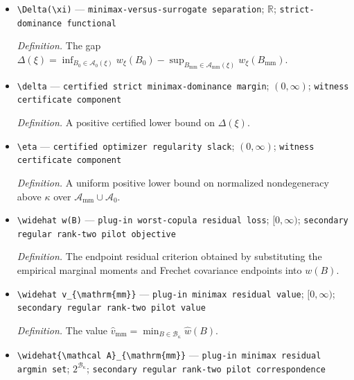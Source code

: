 \documentclass{article}
\begin{document}
\begin{itemize}
  \par\smallskip\noindent\emph{Definition.} \texttt{A checkable record of the chart cover,\allowbreak{} feasible incumbent,\allowbreak{} minimization bounds,\allowbreak{} retained outer boxes,\allowbreak{} exact infeasibility or lower-\allowbreak{}bound pruning records,\allowbreak{} and mesh.}
  \item \texttt{\textbackslash{}\allowbreak{}Delta(\textbackslash{}\allowbreak{}xi)} --- \texttt{minimax-\allowbreak{}versus-\allowbreak{}surrogate separation}; \(\mathbb R\); \texttt{strict-\allowbreak{}dominance functional}
  \par\smallskip\noindent\emph{Definition.} The gap \(\Delta(\xi)=\inf_{B_0\in\mathcal A_0(\xi)}w_\xi(B_0)-\sup_{B_{\mathrm{mm}}\in\mathcal A_{\mathrm{mm}}(\xi)}w_\xi(B_{\mathrm{mm}})\).
  \item \texttt{\textbackslash{}\allowbreak{}delta} --- \texttt{certified strict minimax-\allowbreak{}dominance margin}; \((0,\infty)\); \texttt{witness certificate component}
  \par\smallskip\noindent\emph{Definition.} A positive certified lower bound on \(\Delta(\xi)\).
  \item \texttt{\textbackslash{}\allowbreak{}eta} --- \texttt{certified optimizer regularity slack}; \((0,\infty)\); \texttt{witness certificate component}
  \par\smallskip\noindent\emph{Definition.} A uniform positive lower bound on normalized nondegeneracy above \(\kappa\) over \(\mathcal A_{\mathrm{mm}}\cup\mathcal A_0\).
  \item \texttt{\textbackslash{}\allowbreak{}widehat w(B)} --- \texttt{plug-\allowbreak{}in worst-\allowbreak{}copula residual loss}; \([0,\infty)\); \texttt{secondary regular rank-\allowbreak{}two pilot objective}
  \par\smallskip\noindent\emph{Definition.} The endpoint residual criterion obtained by substituting the empirical marginal moments and Frechet covariance endpoints into \(w(B)\).
  \item \texttt{\textbackslash{}\allowbreak{}widehat v\_\allowbreak{}\{\textbackslash{}\allowbreak{}mathrm\{mm\}\allowbreak{}\}\allowbreak{}} --- \texttt{plug-\allowbreak{}in minimax residual value}; \([0,\infty)\); \texttt{secondary regular rank-\allowbreak{}two pilot value}
  \par\smallskip\noindent\emph{Definition.} The value \(\widehat v_{\mathrm{mm}}=\min_{B\in\mathcal B_\kappa}\widehat w(B)\).
  \item \texttt{\textbackslash{}\allowbreak{}widehat\{\textbackslash{}\allowbreak{}mathcal A\}\allowbreak{}\_\allowbreak{}\{\textbackslash{}\allowbreak{}mathrm\{mm\}\allowbreak{}\}\allowbreak{}} --- \texttt{plug-\allowbreak{}in minimax residual argmin set}; \(2^{\mathcal B_\kappa}\); \texttt{secondary regular rank-\allowbreak{}two pilot correspondence}

\end{itemize}
\end{document}
